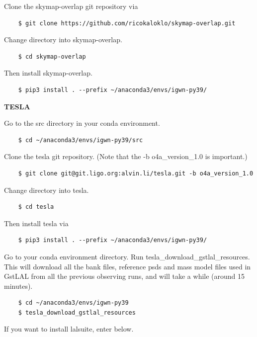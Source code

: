 Clone the skymap-overlap git repository via

\begin{verbatim}
    $ git clone https://github.com/ricokaloklo/skymap-overlap.git
\end{verbatim}

Change directory into skymap-overlap.

\begin{verbatim}
    $ cd skymap-overlap
\end{verbatim}

Then install skymap-overlap.

\begin{verbatim}
    $ pip3 install . --prefix ~/anaconda3/envs/igwn-py39/
\end{verbatim}

\textbf{TESLA}

Go to the src directory in your conda environment.

\begin{verbatim}
    $ cd ~/anaconda3/envs/igwn-py39/src
\end{verbatim}

Clone the tesla git repository. (Note that the -b o4a\_version\_1.0 is important.)

\begin{verbatim}
    $ git clone git@git.ligo.org:alvin.li/tesla.git -b o4a_version_1.0
\end{verbatim}

Change directory into tesla.

\begin{verbatim}
    $ cd tesla
\end{verbatim}

Then install tesla via

\begin{verbatim}
    $ pip3 install . --prefix ~/anaconda3/envs/igwn-py39/
\end{verbatim}

Go to your conda environment directory. Run tesla\_download\_gstlal\_resources. This will download all the bank files, reference psds and mass model files used in GstLAL from all the previous observing runs, and will take a while (around 15 minutes).

\begin{verbatim}
    $ cd ~/anaconda3/envs/igwn-py39
    $ tesla_download_gstlal_resources
\end{verbatim}

If you want to install lalsuite, enter below.

